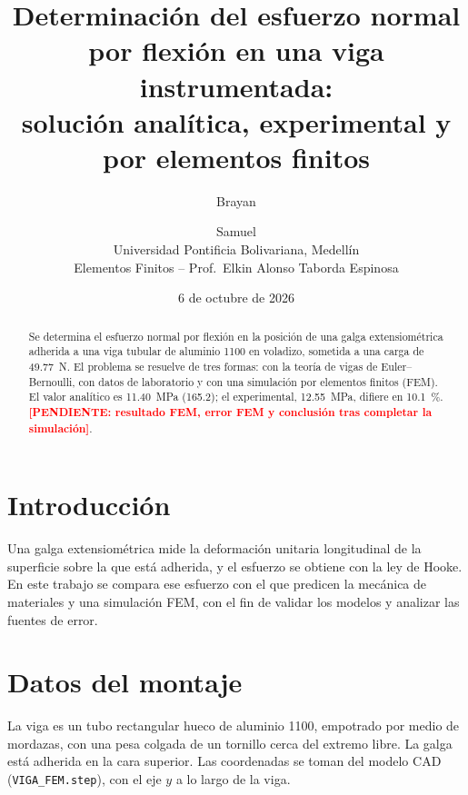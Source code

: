 \documentclass[11pt,a4paper]{article}
\title{Determinaci\'on del esfuerzo normal por flexi\'on en una viga instrumentada:\\ soluci\'on anal\'itica, experimental y por elementos finitos}
\author{Brayan \pend{apellidos} \and Samuel \pend{apellidos}\\[2pt]
Universidad Pontificia Bolivariana, Medell\'in\\ Elementos Finitos -- Prof.\ Elkin Alonso Taborda Espinosa}
\date{6 de octubre de 2026}
\newcommand{\pend}[1]{\textcolor{red}{\textbf{[PENDIENTE: #1]}}}
\begin{document}
\maketitle

\begin{abstract}
Se determina el esfuerzo normal por flexi\'on en la posici\'on de una galga extensiom\'etrica adherida a una viga tubular de aluminio 1100 en voladizo, sometida a una carga de \SI{49,77}{N}. El problema se resuelve de tres formas: con la teor\'ia de vigas de Euler--Bernoulli, con datos de laboratorio y con una simulaci\'on por elementos finitos (FEM). El valor anal\'itico es \SI{11,40}{MPa} (\SI{165,2}{\microstrain}); el experimental, \SI{12,55}{MPa}, difiere en \SI{+10,1}{\percent}. \pend{resultado FEM, error FEM y conclusi\'on tras completar la simulaci\'on}.
\end{abstract}

\section{Introducci\'on}
Una galga extensiom\'etrica mide la deformaci\'on unitaria longitudinal de la superficie sobre la que est\'a adherida, y el esfuerzo se obtiene con la ley de Hooke. En este trabajo se compara ese esfuerzo con el que predicen la mec\'anica de materiales y una simulaci\'on FEM, con el fin de validar los modelos y analizar las fuentes de error.

\section{Datos del montaje}
La viga es un tubo rectangular hueco de aluminio 1100, empotrado por medio de mordazas, con una pesa colgada de un tornillo cerca del extremo libre. La galga est\'a adherida en la cara superior. Las coordenadas se toman del modelo CAD (\texttt{VIGA\_FEM.step}), con el eje $y$ a lo largo de la viga.
\end{document}
